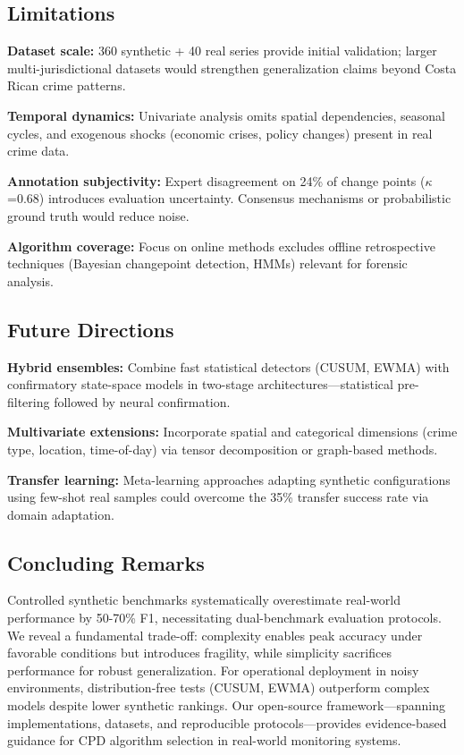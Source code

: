 \documentclass[journal,article,submit,pdftex,moreauthors]{Definitions/mdpi}
\begin{document}
\subsection{Limitations}

\textbf{Dataset scale:} 360 synthetic + 40 real series provide initial validation; larger multi-jurisdictional datasets would strengthen generalization claims beyond Costa Rican crime patterns.

\textbf{Temporal dynamics:} Univariate analysis omits spatial dependencies, seasonal cycles, and exogenous shocks (economic crises, policy changes) present in real crime data.

\textbf{Annotation subjectivity:} Expert disagreement on 24\% of change points ($\kappa$=0.68) introduces evaluation uncertainty. Consensus mechanisms or probabilistic ground truth would reduce noise.

\textbf{Algorithm coverage:} Focus on online methods excludes offline retrospective techniques (Bayesian changepoint detection, HMMs) relevant for forensic analysis.


\subsection{Future Directions}

\textbf{Hybrid ensembles:} Combine fast statistical detectors (CUSUM, EWMA) with confirmatory state-space models in two-stage architectures—statistical pre-filtering followed by neural confirmation.

\textbf{Multivariate extensions:} Incorporate spatial and categorical dimensions (crime type, location, time-of-day) via tensor decomposition or graph-based methods.

\textbf{Transfer learning:} Meta-learning approaches adapting synthetic configurations using few-shot real samples could overcome the 35\% transfer success rate via domain adaptation.


\subsection{Concluding Remarks}

Controlled synthetic benchmarks systematically overestimate real-world performance by 50-70\% F1, necessitating dual-benchmark evaluation protocols. We reveal a fundamental trade-off: complexity enables peak accuracy under favorable conditions but introduces fragility, while simplicity sacrifices performance for robust generalization. For operational deployment in noisy environments, distribution-free tests (CUSUM, EWMA) outperform complex models despite lower synthetic rankings. Our open-source framework—spanning implementations, datasets, and reproducible protocols—provides evidence-based guidance for CPD algorithm selection in real-world monitoring systems.
\end{document}
